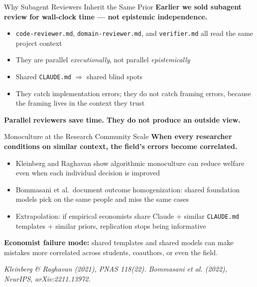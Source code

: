 \documentclass[10pt,english,aspectratio=169]{beamer}
\begin{document}
\begin{frame}{Why Subagent Reviewers Inherit the Same Prior}
\textbf{Earlier we sold subagent review for wall-clock time --- not epistemic independence.}

\vspace{0.25cm}

\begin{itemize}
    \item \texttt{code-reviewer.md}, \texttt{domain-reviewer.md}, and \texttt{verifier.md} all read the same project context
    \item They are parallel \textit{executionally}, not parallel \textit{epistemically}
    \item Shared \texttt{CLAUDE.md} $\Rightarrow$ shared blind spots
    \item They catch implementation errors; they do not catch framing errors, because the framing lives in the context they trust
\end{itemize}

\vspace{0.25cm}

\textbf{Parallel reviewers save time. They do not produce an outside view.}
\end{frame}

\begin{frame}{Monoculture at the Research Community Scale}
\textbf{When every researcher conditions on similar context, the field's errors become correlated.}

\vspace{0.25cm}

\begin{itemize}
    \item Kleinberg and Raghavan show algorithmic monoculture can reduce welfare even when each individual decision is improved
    \item Bommasani et al.\ document outcome homogenization: shared foundation models pick on the same people and miss the same cases
    \item Extrapolation: if empirical economists share Claude + similar \texttt{CLAUDE.md} templates + similar priors, replication stops being informative
\end{itemize}

\vspace{0.25cm}

\textbf{Economist failure mode:} shared templates and shared models can make mistakes more correlated across students, coauthors, or even the field.

\vspace{0.15cm}
{\scriptsize \textit{Kleinberg \& Raghavan (2021), PNAS 118(22). Bommasani et al. (2022), NeurIPS, arXiv:2211.13972.}}
\end{frame}
\end{document}
